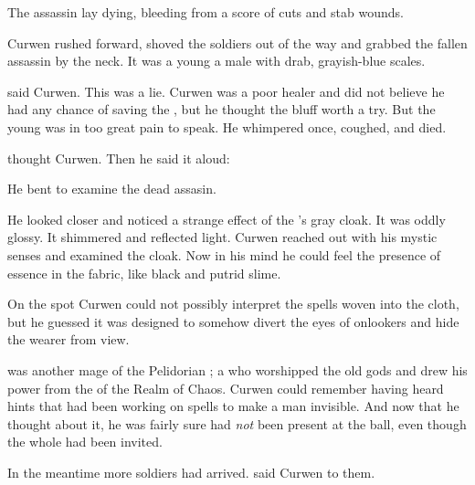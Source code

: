 The assassin lay dying, bleeding from a score of cuts and stab wounds. 

Curwen rushed forward, shoved the soldiers out of the way and grabbed the fallen assassin by the neck. 
It was a young \dax\dash a male \scatha\dash with drab, grayish-blue scales. 

 said Curwen.
This was a lie. 
Curwen was a poor healer and did not believe he had any chance of saving the \scatha, but he thought the bluff worth a try.
But the young \dax was in too great pain to speak. 
He whimpered once, coughed, and died. 

 thought Curwen. 
Then he said it aloud: 

He bent to examine the dead assasin. 
  
He looked closer and noticed a strange effect of the \scatha's gray cloak. 
It was oddly glossy. 
It shimmered and reflected light. 
Curwen reached out with his mystic senses and examined the cloak. 
Now in his mind he could feel the presence of \daemonic essence in the fabric, like black and putrid slime. 

On the spot Curwen could not possibly interpret the spells woven into the cloth, but he guessed it was designed to somehow divert the eyes of onlookers and hide the wearer from view. 

\Ambrose \Onatol was another mage of the Pelidorian \ishrah; a \rethyax who worshipped the old \Ortaican gods and drew his power from the \daemons of the Realm of Chaos. 
Curwen could remember having heard hints that \Onatol had been working on spells to make a man invisible. 
And now that he thought about it, he was fairly sure \Onatol had \emph{not} been present at the ball, even though the whole \ishrah had been invited. 


In the meantime more soldiers had arrived. 
 said Curwen to them.

